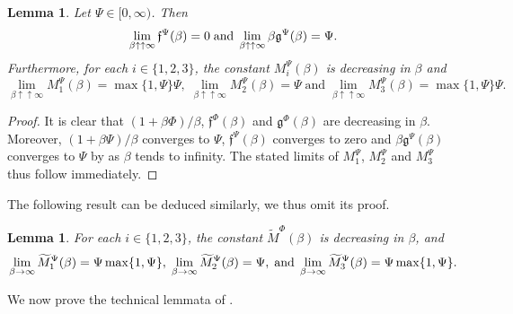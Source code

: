 \documentclass[10pt]{article} %
\newtheorem{lemma}[theorem]{Lemma}
\newcommand\ff{\mathfrak f}
\newcommand\fg{\mathfrak g}
\newcommand{\1}{\mathbf{1}}
\begin{document}
\begin{lemma}\label{lem::contraction_constants_reflected_bsde}
	Let $\Psi \in [0,\infty)$. Then
	\begin{equation*}
		\lim_{\beta \uparrow\uparrow\infty} \ff^\Psi(\beta) = 0 \; \text{\rm and} \; \lim_{\beta \uparrow\uparrow\infty} \beta \fg^\Psi(\beta) = \Psi.
	\end{equation*}
	Furthermore, for each $i \in \{1,2,3\}$, the constant $M^\Psi_i(\beta)$ is decreasing in $\beta$ and
	\begin{equation*}
		\lim_{\beta\uparrow\uparrow\infty} M^\Psi_1(\beta) =\max\{1,\Psi\}\Psi, \; \lim_{\beta\uparrow\uparrow\infty} M^\Psi_2(\beta) = \Psi \; \text{and} \; \lim_{\beta\uparrow\uparrow\infty} M^\Psi_3(\beta) = \max\{1,\Psi\}\Psi.
	\end{equation*}
\end{lemma}


\begin{proof}
	It is clear that $(1+\beta\Phi)/\beta$, $\ff^\Phi(\beta)$ and $\fg^\Phi(\beta)$ are decreasing in $\beta$. Moreover, $(1+\beta\Psi)/\beta$ converges to $\Psi$, $\ff^\Psi(\beta)$ converges to zero and $\beta\fg^\Psi(\beta)$ converges to $\Psi$ by  as $\beta$ tends to infinity. The stated limits of $M^\Psi_1$, $M^\Psi_2$ and $M^\Psi_3$ thus follow immediately.
\end{proof}

The following result can be deduced similarly, we thus omit its proof.

\begin{lemma}\label{lem::contraction_constants_bsde}
	For each $i \in \{1,2,3\}$, the constant $\widetilde M^\Phi(\beta)$ is decreasing in $\beta$, and
	\begin{equation*}
		\lim_{\beta\rightarrow\infty} \widetilde M^\Psi_1(\beta) =
			\Psi\max\{1,\Psi\},
		\; 
		\lim_{\beta\rightarrow\infty} \widetilde M^\Psi_2(\beta) = \Psi, \; \text{\rm and} \; 
		 \lim_{\beta\rightarrow\infty} \widetilde M^\Psi_3(\beta) = \Psi\max\{1,\Psi\}.
	\end{equation*}
\end{lemma}


We now prove the technical lemmata of .
\end{document}
